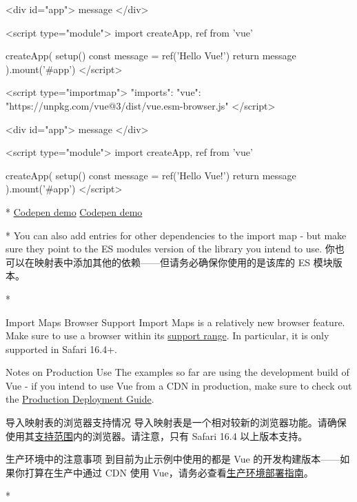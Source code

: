 \begin{paracol}{2}
\begin{codeHtml}
<div id="app">{{ message }}</div>

<script type="module">
import { createApp, ref } from 'vue'

createApp({
    setup() {
    const message = ref('Hello Vue!')
    return {
        message
    }
    }
}).mount('#app')
</script>
\end{codeHtml}  
\switchcolumn
\begin{codeHtml}
<script type="importmap">
{
    "imports": {
    "vue": "https://unpkg.com/vue@3/dist/vue.esm-browser.js"
    }
}
</script>

<div id="app">{{ message }}</div>

<script type="module">
import { createApp, ref } from 'vue'

createApp({
    setup() {
    const message = ref('Hello Vue!')
    return {
        message
    }
    }
}).mount('#app')
</script>
\end{codeHtml}  
\switchcolumn[0]*%
\href{https://codepen.io/vuejs-examples/pen/YzRyRYM}{Codepen demo}
\switchcolumn
\href{https://codepen.io/vuejs-examples/pen/YzRyRYM}{Codepen demo}

\switchcolumn[0]*%
You can also add entries for other dependencies to the import map - but
make sure they point to the ES modules version of the library you intend
to use.
\switchcolumn 
你也可以在映射表中添加其他的依赖------但请务必确保你使用的是该库的 ES
模块版本。

\switchcolumn[0]*%
\begin{vueQuote}{Import Maps Browser Support}
Import Maps is a relatively new browser feature. Make sure to use a
browser within its \href{https://caniuse.com/import-maps}{support
range}. In particular, it is only supported in Safari 16.4+.
\end{vueQuote}
\begin{vueQuoteWarn}{Notes on Production Use}
The examples so far are using the development build of Vue - if you
intend to use Vue from a CDN in production, make sure to check out the
\href{https://vuejs.org/guide/best-practices/production-deployment.html\#without-build-tools}{Production
Deployment Guide}.
\end{vueQuoteWarn}
\switchcolumn
\begin{vueQuote}{导入映射表的浏览器支持情况}
导入映射表是一个相对较新的浏览器功能。请确保使用其\href{https://caniuse.com/import-maps}{支持范围}内的浏览器。请注意，只有
Safari 16.4 以上版本支持。
\end{vueQuote}
\begin{vueQuoteWarn}{生产环境中的注意事项}
到目前为止示例中使用的都是 Vue
的开发构建版本------如果你打算在生产中通过 CDN 使用
Vue，请务必查看\href{https://cn.vuejs.org/guide/best-practices/production-deployment.html\#without-build-tools}{生产环境部署指南}。
\end{vueQuoteWarn}
\switchcolumn[0]*%

\end{paracol}
